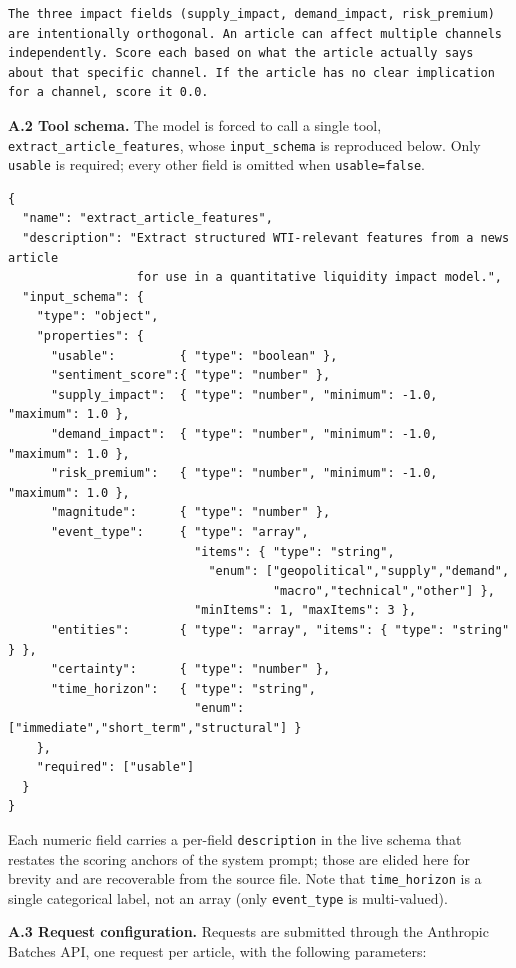 \begin{lstlisting}
The three impact fields (supply_impact, demand_impact, risk_premium) are intentionally orthogonal. An article can affect multiple channels independently. Score each based on what the article actually says about that specific channel. If the article has no clear implication for a channel, score it 0.0.
\end{lstlisting}

\textbf{A.2 Tool schema.} The model is forced to call a single tool, \texttt{extract\_article\_features}, whose \texttt{input\_schema} is reproduced below. Only \texttt{usable} is required; every other field is omitted when \texttt{usable=false}.

\begin{lstlisting}
{
  "name": "extract_article_features",
  "description": "Extract structured WTI-relevant features from a news article
                  for use in a quantitative liquidity impact model.",
  "input_schema": {
    "type": "object",
    "properties": {
      "usable":         { "type": "boolean" },
      "sentiment_score":{ "type": "number" },
      "supply_impact":  { "type": "number", "minimum": -1.0, "maximum": 1.0 },
      "demand_impact":  { "type": "number", "minimum": -1.0, "maximum": 1.0 },
      "risk_premium":   { "type": "number", "minimum": -1.0, "maximum": 1.0 },
      "magnitude":      { "type": "number" },
      "event_type":     { "type": "array",
                          "items": { "type": "string",
                            "enum": ["geopolitical","supply","demand",
                                     "macro","technical","other"] },
                          "minItems": 1, "maxItems": 3 },
      "entities":       { "type": "array", "items": { "type": "string" } },
      "certainty":      { "type": "number" },
      "time_horizon":   { "type": "string",
                          "enum": ["immediate","short_term","structural"] }
    },
    "required": ["usable"]
  }
}
\end{lstlisting}

Each numeric field carries a per-field \texttt{description} in the live schema that restates the scoring anchors of the system prompt; those are elided here for brevity and are recoverable from the source file. Note that \texttt{time\_horizon} is a single categorical label, not an array (only \texttt{event\_type} is multi-valued).

\textbf{A.3 Request configuration.} Requests are submitted through the Anthropic Batches API, one request per article, with the following parameters:

